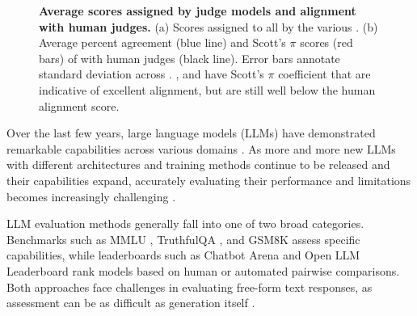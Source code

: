 \begin{figure}[t]
\begin{subfigure}[b]{0.44\textwidth}
        \caption{}
        \vspace{-2mm}
        \label{fig:llmalignment_b}
    \end{subfigure}
    \caption{\textbf{Average scores assigned by judge models and alignment with human judges.} (a) Scores assigned to all \evaluatormodels by the various \judgemodels. 
    (b) Average percent agreement (blue line) and Scott's $\pi$ scores (red bars) of \judgemodels with human judges (black line).
    Error bars annotate standard deviation across \evaluatormodels. 
    ,  and \judge{\gpt} have Scott's $\pi$ coefficient that are indicative of excellent alignment, but are still well below the human alignment score. %
    }
    \label{fig:llmalignment}
\end{figure}

Over the last few years, large language models (LLMs) have demonstrated remarkable capabilities across various domains \citep[i.a.]{radford2019language, brown2020language, achiam2023gpt, meta2024llama3}.
% 
As more and more new LLMs with different architectures and training methods continue to be released and their capabilities expand, accurately evaluating their performance and limitations becomes increasingly challenging \citep{zheng2024judging,ohmer2024form,benchekroun2023worldsense,madaan2024quantifying,li2023generative}.


LLM evaluation methods generally fall into one of two broad categories. Benchmarks such as MMLU \citep{mmlu}, TruthfulQA \citep{lin2021truthfulqa}, and GSM8K \citep{cobbe2021training} assess specific capabilities, while leaderboards such as Chatbot Arena \citep{chiang2024chatbot} and Open LLM Leaderboard \citep{open-llm-leaderboard} rank models based on human or automated pairwise comparisons. Both approaches face challenges in evaluating free-form text responses, as assessment can be as difficult as generation itself \citep[see e.g.][]{chang2023survey, bavaresco2024llmsinsteadhumanjudges}.

